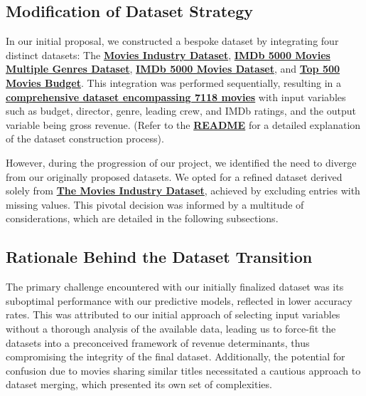 \documentclass[conference]{IEEEtran}
\begin{document}
     \subsection{Modification of Dataset Strategy}
        In our initial proposal, we constructed a bespoke dataset by integrating four distinct datasets: The \href{https://www.kaggle.com/datasets/danielgrijalvas/movies}{\textbf{Movies Industry Dataset}}, \href{https://www.kaggle.com/datasets/rakkesharv/imdb-5000-movies-multiple-genres-dataset}{\textbf{IMDb 5000 Movies Multiple Genres Dataset}}, \href{https://www.kaggle.com/datasets/carolzhangdc/imdb-5000-movie-dataset}{\textbf{IMDb 5000 Movies Dataset}}, and \href{https://www.kaggle.com/datasets/mitchellharrison/top-500-movies-budget}{\textbf{Top 500 Movies Budget}}. This integration was performed sequentially, resulting in a \href{https://github.com/Vikranth3140/Movie-Revenue-Prediction/blob/main/old%20datasets/final_dataset.csv}{\textbf{comprehensive dataset encompassing 7118 movies}} with input variables such as budget, director, genre, leading crew, and IMDb ratings, and the output variable being gross revenue. (Refer to the \href{https://github.com/Vikranth3140/Movie-Revenue-Prediction/blob/main/old%20datasets/README.md}{\textbf{README}} for a detailed explanation of the dataset construction process).
        
        However, during the progression of our project, we identified the need to diverge from our originally proposed datasets. We opted for a refined dataset derived solely from \href{https://www.kaggle.com/datasets/danielgrijalvas/movies}{\textbf{The Movies Industry Dataset}}, achieved by excluding entries with missing values. This pivotal decision was informed by a multitude of considerations, which are detailed in the following subsections.
    
    \subsection{Rationale Behind the Dataset Transition}
        The primary challenge encountered with our initially finalized dataset was its suboptimal performance with our predictive models, reflected in lower accuracy rates. This was attributed to our initial approach of selecting input variables without a thorough analysis of the available data, leading us to force-fit the datasets into a preconceived framework of revenue determinants, thus compromising the integrity of the final dataset. Additionally, the potential for confusion due to movies sharing similar titles necessitated a cautious approach to dataset merging, which presented its own set of complexities.
        
\end{document}
